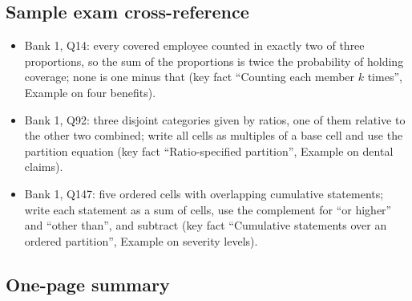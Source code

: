 \subsection{Sample exam cross-reference}

\begin{itemize}[nosep]
\item Bank 1, Q14: every covered employee counted in exactly two of three proportions, so
      the sum of the proportions is twice the probability of holding coverage; none is one
      minus that (key fact ``Counting each member $k$ times'', Example on four benefits).
\item Bank 1, Q92: three disjoint categories given by ratios, one of them relative to the
      other two combined; write all cells as multiples of a base cell and use the partition
      equation (key fact ``Ratio-specified partition'', Example on dental claims).
\item Bank 1, Q147: five ordered cells with overlapping cumulative statements; write each
      statement as a sum of cells, use the complement for ``or higher'' and ``other than'',
      and subtract (key fact ``Cumulative statements over an ordered partition'', Example
      on severity levels).
\end{itemize}

\subsection{One-page summary}

